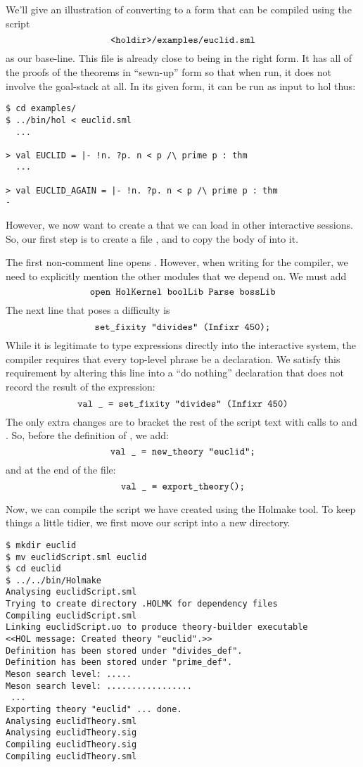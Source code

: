 We'll give an illustration of converting to a form that can be
compiled using the script
\[
  \mbox{\ml{<holdir>/examples/euclid.sml}}
\] as our base-line.  This
file is already close to being in the right form.  It has all of the
proofs of the theorems in ``sewn-up'' form so that when run, it does
not involve the goal-stack at all.  In its given form, it can be run
as input to \textsf{hol} thus:

\setcounter{sessioncount}{0}
\begin{session}
\begin{verbatim}
$ cd examples/
$ ../bin/hol < euclid.sml
  ...

> val EUCLID = |- !n. ?p. n < p /\ prime p : thm
  ...

> val EUCLID_AGAIN = |- !n. ?p. n < p /\ prime p : thm
-
\end{verbatim}
\end{session}

However, we now want to create a  that we can load in
other interactive sessions.  So, our first step is to create a file
, and to copy the body of  into
it.

The first non-comment line opens .  However, when
writing for the compiler, we need to explicitly mention the other
\HOL{} modules that we depend on.  We must add
\[
\mbox{\ml{open HolKernel boolLib Parse bossLib}}
\]
The next line that poses a difficulty is
\[
  \mbox{\ml{set\_fixity "divides" (Infixr 450);}}
\]
While it is legitimate to type expressions directly into the
interactive system, the compiler requires that every top-level phrase
be a declaration.  We satisfy this requirement by altering this line
into a ``do nothing'' declaration that does not record the result of
the expression:
\[
\mbox{\ml{val \_{} = set\_fixity "divides" (Infixr 450)}}
\]
The only extra changes are to bracket the rest of the script text
with calls to  and .  So,
before the definition of , we add:
\[
\mbox{\ml{val \_{} = new\_theory "euclid";}}
\]
and at the end of the file:
\[
\mbox{\ml{val \_{} = export\_theory();}}
\]

Now, we can compile the script we have created using the
\textsf{Holmake} tool.  To keep things a little tidier, we first move
our script into a new directory.

\begin{session}
\begin{verbatim}
$ mkdir euclid
$ mv euclidScript.sml euclid
$ cd euclid
$ ../../bin/Holmake
Analysing euclidScript.sml
Trying to create directory .HOLMK for dependency files
Compiling euclidScript.sml
Linking euclidScript.uo to produce theory-builder executable
<<HOL message: Created theory "euclid".>>
Definition has been stored under "divides_def".
Definition has been stored under "prime_def".
Meson search level: .....
Meson search level: .................
 ...
Exporting theory "euclid" ... done.
Analysing euclidTheory.sml
Analysing euclidTheory.sig
Compiling euclidTheory.sig
Compiling euclidTheory.sml
\end{verbatim}
\end{session}

